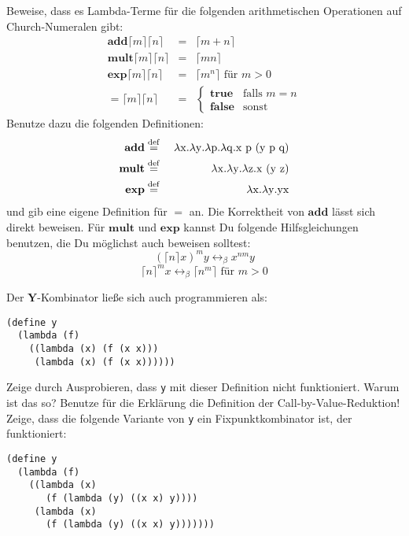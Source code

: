 \begin{aufgabe}\label{ex:church}
  Beweise, dass es Lambda-Terme für die folgenden arithmetischen
  Operationen auf Church-Numeralen gibt:
  \begin{eqnarray*}
    \mathbf{add} \lceil m\rceil \lceil n\rceil &=& \lceil m+n\rceil
    \\
    \mathbf{mult} \lceil m\rceil \lceil n\rceil &=& \lceil mn\rceil
    \\
    \mathbf{exp} \lceil m\rceil \lceil n\rceil &=& \lceil m^n\rceil
    \textrm{ für } m>0\\
    \mathbf{=}\lceil m\rceil \lceil n\rceil &=&
    \begin{cases}
      \mathbf{true} & \text{falls } m = n\\
      \mathbf{false} & \text{sonst}
    \end{cases}
  \end{eqnarray*}
  Benutze dazu die folgenden Definitionen:
  \begin{eqnarray*}
    \mathbf{add} &\stackrel{\rm def}{=}{}& \lambda \mathrm x.\lambda \mathrm y.\lambda \mathrm p.\lambda \mathrm q.\mathrm x~\mathrm p~(\mathrm y~\mathrm p~\mathrm q)\\
    \mathbf{mult} &\stackrel{\rm def}{=}{}& \lambda \mathrm x.\lambda \mathrm y.\lambda \mathrm z.\mathrm x~(\mathrm y~\mathrm z)\\
    \mathbf{exp} &\stackrel{\rm def}{=}{}& \lambda \mathrm x.\lambda \mathrm y.\mathrm y\mathrm x
  \end{eqnarray*}
  und gib eine eigene Definition für $=$ an.
  Die Korrektheit von $\mathbf{add}$ lässt sich direkt beweisen.
  Für $\mathbf{mult}$ und $\mathbf{exp}$ kannst Du
  folgende Hilfsgleichungen benutzen, die Du möglichst auch beweisen solltest:
  \begin{displaymath}
    (\lceil n\rceil x)^m y \leftrightarrow_{\beta} x^{nm} y
  \end{displaymath}
  \begin{displaymath}
    \label{eq:lem-2}
    \lceil n\rceil^m x \leftrightarrow_{\beta} \lceil n^m\rceil
    \textrm{ für } m>0
  \end{displaymath}
\end{aufgabe}
\begin{aufgabe}
  Der $\mathbf{Y}$-Kombinator ließe sich auch programmieren
  als:
\begin{verbatim}
(define y 
  (lambda (f)
    ((lambda (x) (f (x x)))
     (lambda (x) (f (x x))))))
\end{verbatim}
  Zeige durch Ausprobieren, dass \texttt{y} mit dieser Definition 
  nicht funktioniert.  Warum ist das so?  Benutze für die
  Erklärung die Definition der Call-by-Value-Reduktion!
  Zeige, dass die folgende Variante von \texttt{y} ein
  Fixpunktkombinator ist, der funktioniert:
\begin{verbatim}
(define y
  (lambda (f)
    ((lambda (x)
       (f (lambda (y) ((x x) y))))
     (lambda (x)
       (f (lambda (y) ((x x) y)))))))
\end{verbatim}

\end{aufgabe}
